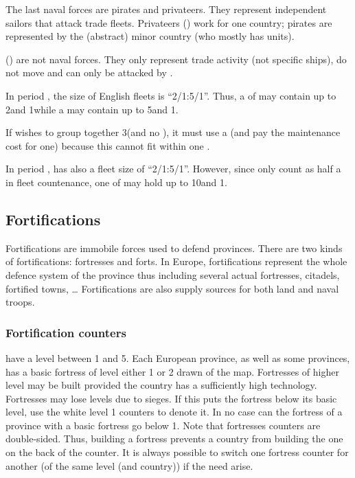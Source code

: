 \aparag[Pirates.] The last naval forces are pirates and privateers. They
represent independent sailors that attack trade fleets. Privateers (\corsaire)
work for one country; pirates are represented by the (abstract) minor country
 (who mostly has \corsaire units).

 (\TradeFLEET) are not naval forces. They only represent
trade activity (not specific ships), do not move and can only be attacked by
\corsaire.

\begin{exemple}
  In period , the size of English fleets is ``2/1:5/1''. Thus, a
  \FLEET\Facemoins of \ANG may contain up to 2\NWD and 1\NTD while a
  \FLEET\Faceplus may contain up to 5\NWD and 1\NTD.

  If \ANG wishes to group together 3\NWD (and no \NTD), it must use a
  \FLEET\Faceplus (and pay the maintenance cost for one) because this cannot
  fit within one \FLEET\Facemoins.

  In period , \TUR has also a fleet size of ``2/1:5/1''. However,
  since \NGD only count as half a \ND in fleet countenance, one
  \FLEET\Faceplus of \TUR may hold up to 10\NGD and 1\NTD.
\end{exemple}



\subsection{Fortifications}

\aparag Fortifications are immobile forces used to defend provinces. There are
two kinds of fortifications: fortresses and forts. In Europe, fortifications
represent the whole defence system of the province thus including several
actual fortresses, citadels, fortified towns, \ldots
\bparag Fortifications are also supply sources for both land and naval troops.

\subsubsection{Fortification counters}
\aparag[Fortresses] have a level between 1 and 5.
\bparag Each European province, as well as some \ROTW provinces, has a basic
fortress of level either 1 or 2 drawn of the map.
\bparag Fortresses of higher level may be built provided the country has a
sufficiently high technology.
\bparag Fortresses may lose levels due to sieges. If this puts the fortress
below its basic level, use the white level 1 counters to denote it. In no case
can the fortress of a province with a basic fortress go below 1.
\bparag Note that fortresses counters are double-sided. Thus, building a
fortress prevents a country from building the one on the back of the
counter. It is always possible to switch one fortress counter for another (of
the same level (and country)) if the need arise.

